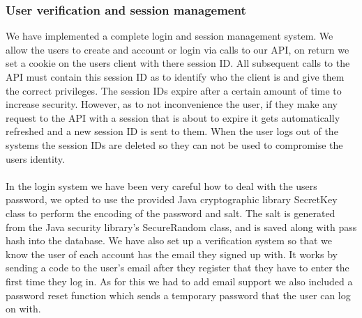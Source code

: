 \documentclass[10pt,a4paper]{article}
\begin{document}
\subsubsection{User verification and session management}
\noindent We have implemented a complete login and session management system. We 
allow the users to create and account or login via calls to our API, on return 
we set a cookie on the users client with there session ID. All subsequent calls 
to the API must contain this session ID as to identify who the client is and 
give them the correct privileges. The session IDs expire after a certain amount 
of time to increase security. However, as to not inconvenience the user, if they 
make any request to the API with a session that is about to expire it gets 
automatically refreshed and a new session ID is sent to them. When the user logs 
out of the systems the session IDs are deleted so they can not be used to 
compromise the users identity.
\\
\\
\noindent In the login system we have been very careful how to deal with the 
users password, we opted to use the provided Java cryptographic library SecretKey class 
to perform the encoding of the password and salt. The salt is generated from the 
Java security library’s SecureRandom class, and is saved along with pass hash 
into the database. We have also set up a verification system so that we know the 
user of each account has the email they signed up with. It works by sending a 
code to the user's email after they register that they have to enter the first 
time they log in. As for this we had to add email support we also included a 
password reset function which sends a temporary password that the user can log 
on with.  
\end{document}
